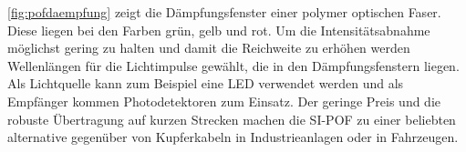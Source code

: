 
\autoref{fig:pofdaempfung} zeigt die Dämpfungsfenster einer polymer optischen
Faser. Diese liegen bei den Farben grün, gelb und rot. Um die Intensitätsabnahme
möglichst gering zu halten und damit die Reichweite zu erhöhen werden
Wellenlängen für die Lichtimpulse gewählt, die in den Dämpfungsfenstern liegen.
Als Lichtquelle kann zum Beispiel eine LED verwendet werden und als Empfänger
kommen Photodetektoren zum Einsatz. Der geringe Preis und die robuste
Übertragung auf kurzen Strecken machen die SI-POF zu einer beliebten alternative
gegenüber von Kupferkabeln in Industrieanlagen oder in Fahrzeugen. \cite{poflee}
